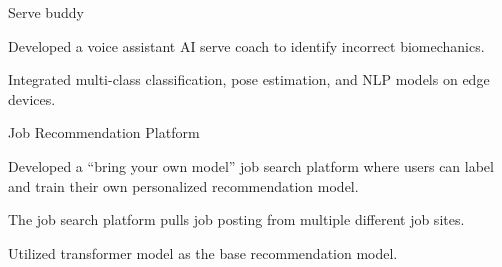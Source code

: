 
\begin{cventries}

\cventry
    {} %
    {Serve buddy} %
    {} %
    {} %
    {
      \begin{cvitems} %
        \item{Developed a voice assistant AI serve coach to identify incorrect biomechanics.}
        \item{Integrated multi-class classification, pose estimation, and NLP models on edge devices.}
      \end{cvitems}
    }
\cventry
    {} %
    {Job Recommendation Platform} %
    {} %
    {} %
    {
      \begin{cvitems} %
        \item{Developed a “bring your own model” job search platform where users can label and train their own personalized recommendation model.}
        \item{The job search platform pulls job posting from multiple different job sites.}
        \item{Utilized transformer model as the base recommendation model.}
      \end{cvitems}
    }
\end{cventries}